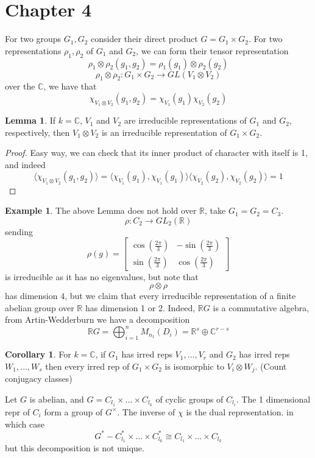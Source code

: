 \documentclass{article}
\theoremstyle{definition}
\newtheorem{lemma}[theorem]{Lemma}
\newtheorem{corollary}[theorem]{Corollary}
\newtheorem{example}[theorem]{Example}
\theoremstyle{remark}
\theoremstyle{plain}
\newcommand{\R}{\mathbb{R}}
\newcommand{\C}{\mathbb{C}}
\begin{document}
\section{Chapter 4}

For two groups $G_1, G_2$ consider their direct product $G = G_1 \times G_2$.
For two representations $\rho_1, \rho_2$ of $G_1$ and $G_2$, we can form their tensor representation
\[\rho_1 \otimes \rho_2(g_1, g_2) = \rho_1(g_1) \otimes \rho_2(g_2)\]
\[\rho_1 \otimes \rho_2: G_1 \times G_2 \to GL(V_1 \otimes V_2)\]
over the $\C$, we have that 
\[\chi_{V_1 \otimes V_2}(g_1, g_2) = \chi_{V_1}(g_1) \chi_{V_2}(g_2)\]

\begin{lemma}
	If $k = \C$, $V_1$ and $V_2$ are irreducible representations of $G_1$ and $G_2$, respectively, then $V_1 \otimes V_2$ is an irreducible representation of $G_1 \times G_2$.
\end{lemma}

\begin{proof}
	Easy way, we can check that its inner product of character with itself is 1, and indeed 
	\[\langle\chi_{V_1 \otimes V_2}(g_1, g_2) \rangle = \langle \chi_{V_1}(g_1), \chi_{V_1}(g_1)\rangle  \langle \chi_{V_2}(g_2), \chi_{V_2}(g_2)\rangle  = 1 \]
\end{proof}

\begin{example}
	The above Lemma does not hold over $\R$, take $G_1 = G_2 = C_3$.
	\[\rho: C_2 \to GL_2(\R)\]sending 
	\[ \rho(g) = \begin{bmatrix} \cos( \frac{2\pi}{3}) & -\sin( \frac{2\pi}{3})\\ \sin( \frac{2\pi}{3}) & \cos( \frac{2\pi}{3})\end{bmatrix}\]
	is irreducible as it has no eigenvalues, but note that 
	\[\rho \otimes \rho\]
has dimension $4$, but we claim that every irreducible representation of a finite abelian group over $\R$ has dimension 1 or 2. 
Indeed, $\R G$ is a commutative algebra, from Artin-Wedderburn we have a decomposition 
\[\R G = \bigoplus_{i=1}^n M_{n_1}(D_i) = \R^s \oplus \C^{r-s}\]
\end{example}
 \begin{corollary}
 	For $k = \C$, if $G_1$ has irred reps $V_1, \dots, V_r$ and $G_2$ has irred reps $W_1, \dots, W_s$ then every irred rep of $G_1 \times G_2$ is isomorphic to $V_i \otimes W_j$.
	(Count conjugacy classes)
 \end{corollary}

Let $G$ is abelian, and $G = C_{l_1} \times \dots \times C_{l_k}$ of cyclic groups of $C_{l_i}$.
The 1 dimensional repr of $C_{i}$ form a group of $G^{\times}$.
The inverse of $\chi$ is the dual representation.
in which case 
\[G^* - C_{l_1}^* \times \dots \times C_{l_k}^* \cong  C_{l_1} \times \dots \times C_{l_k}\]
but this decomposition is not unique.\\
\end{document}
